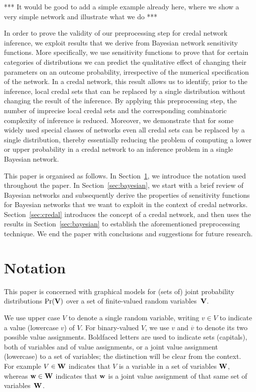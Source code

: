 \documentclass[10pt,a4paper]{paper}
\theoremstyle{definition}
\begin{document}
{\color{red} *** It would be good to add a simple example already here, where we show a very simple network and illustrate what we do ***}

In order to prove the validity of our preprocessing step for credal network inference, we exploit results that we derive from Bayesian network sensitivity functions. More specifically, we use sensitivity functions to prove that for certain categories of distributions we can predict the qualitative effect of changing their parameters on an outcome probability, irrespective of the numerical specification of the network. In a credal network, this result allows us to identify, prior to the inference, local credal sets that can be replaced by a single distribution without changing the result of the inference.
By applying this preprocessing step, the number of imprecise local credal sets and the corresponding combinatoric complexity of inference is reduced. 
Moreover, we demonstrate that for some widely used special classes of networks
even all credal sets can be replaced by a single distribution, thereby essentially reducing the problem of computing a lower or upper probability in a credal network to an inference problem in a single Bayesian network.

This paper is organised as follows. In Section~\ref{sec:notation}, we introduce the notation used throughout the paper. In Section~\ref{sec:bayesian}, we start with a brief review of Bayesian networks and subsequently derive the properties of sensitivity functions for Bayesian networks that we want to exploit in the context of credal networks. Section~\ref{sec:credal} introduces the concept of a credal network, and then uses the results in Section~\ref{sec:bayesian} to establish the aforementioned preprocessing technique. We end the paper with conclusions and suggestions for future research.


\section{Notation}\label{sec:notation}
This paper is concerned with graphical models for (sets of) joint probability distributions $\Pr({\bf V})$ over a set of finite-valued random variables~${\bf V}$.

We use upper case $V$ to denote a single random variable, writing $v \in V$ to indicate a value (lowercase $v$) of $V$. For binary-valued $V$, we use $v$ and $\overline{v}$ to denote its two possible value assignments.
Boldfaced letters are used to indicate sets (capitals), both of variables and of value assignments, or a joint value assignment (lowercase) to a set of variables; the distinction will be clear from the context. For example $V \in {\bf W}$ indicates that $V$ is a variable in a set of variables ${\bf W}$, whereas ${\bf w}\in {\bf W}$ indicates that ${\bf w}$ is a joint value assignment of that same set of variables~${\bf W}$. 
\end{document}
